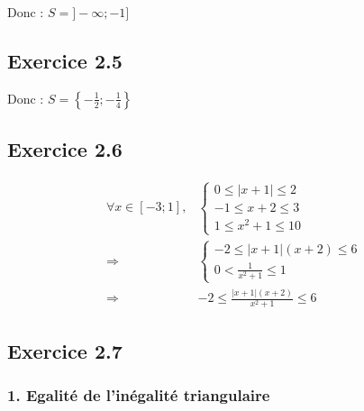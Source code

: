 \documentclass{report}
\begin{document}
Donc : $S= ]-\infty ; -1]$

\subsection*{Exercice 2.5}


Donc : $S=\left\lbrace -\frac{1}{2} ; -\frac{1}{4} \right\rbrace$

\subsection*{Exercice 2.6}

\begin{equation*}
	\begin{split}
		\forall x \in [-3 ; 1],
		& \begin{cases}
			0 \leq |x+1| \leq 2 \\
		    -1 \leq x+2 \leq 3 \\
		    1 \leq x^2 + 1 \leq 10
		\end{cases} \\
		\Longrightarrow 
		& \begin{cases}
			-2 \leq |x+1|(x+2) \leq 6 \\
			0 < \frac{1}{x^2 + 1} \leq 1
		\end{cases} \\
		\Longrightarrow 
		& -2 \leq \frac{|x+1|(x+2)}{x^2 + 1} \leq 6 
	\end{split}
\end{equation*}

\subsection*{Exercice 2.7}

\subsubsection*{1. Egalité de l'inégalité triangulaire}
\end{document}
